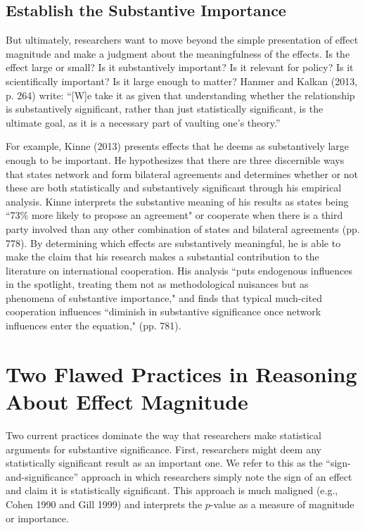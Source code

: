 \documentclass[12pt]{article}
\begin{document}
\subsection*{Establish the Substantive Importance}

But ultimately, researchers want to move beyond the simple presentation of effect magnitude and make a judgment about the meaningfulness of the effects. Is the effect large or small? Is it substantively important? Is it relevant for policy? Is it scientifically important? Is it large enough to matter? Hanmer and Kalkan (2013, p. 264) write: ``[W]e take it as given that understanding whether the relationship is substantively significant, rather than just statistically significant, is the ultimate goal, as it is a necessary part of vaulting one's theory.''

For example, Kinne (2013) presents effects that he deems as substantively large enough to be important. He hypothesizes that there are three discernible ways that states network and form bilateral agreements and determines whether or not these are both statistically and substantively significant through his empirical analysis. Kinne interprets the substantive meaning of his results as states being ``73\% more likely to propose an agreement" or cooperate when there is a third party involved than any other combination of states and bilateral agreements (pp. 778). By determining which effects are substantively meaningful, he is able to make the claim that his research makes a substantial contribution to the literature on international cooperation. His analysis ``puts endogenous influences in the spotlight, treating them not as methodological nuisances but as phenomena of substantive importance," and finds that typical much-cited cooperation influences ``diminish in substantive significance once network influences enter the equation," (pp. 781). 

\section*{Two Flawed Practices in Reasoning About Effect Magnitude}

Two current practices dominate the way that researchers make statistical arguments for substantive significance. First, researchers might deem any statistically significant result as an important one. We refer to this as the ``sign-and-significance'' approach in which researchers simply note the sign of an effect and claim it is statistically significant. This approach is much maligned (e.g., Cohen 1990 and Gill 1999) and interprets the $p$-value as a measure of magnitude or importance.
\end{document}
